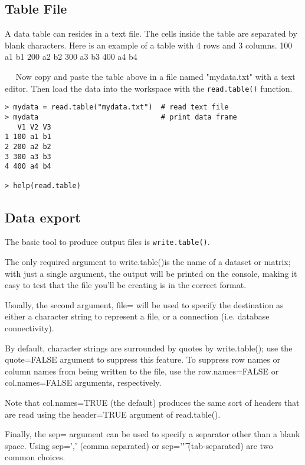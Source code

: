 \subsection{Table File}
 A data table can resides in a text file. The cells inside the table are separated by blank characters. Here is an example of a table with 4 rows and 3 columns.
100   a1   b1 
200   a2   b2 
300   a3   b3 
400   a4   b4 
 
 
Now copy and paste the table above in a file named "mydata.txt" with a text editor. Then load the data into the workspace with the \texttt{read.table()} function.

\begin{framed}
\begin{verbatim}
> mydata = read.table("mydata.txt")  # read text file 
> mydata                             # print data frame 
   V1 V2 V3 
1 100 a1 b1 
2 200 a2 b2 
3 300 a3 b3 
4 400 a4 b4 

> help(read.table) 
\end{verbatim}
\end{framed}
\subsection{Data export}
The basic tool to produce output files is \texttt{write.table()}.
 
The only required argument to write.table()is the name of a dataset or matrix; with just a single argument, the output will be printed on the console, making it easy to test that the file you’ll be creating is in the correct format. 

Usually, the second argument, file= will be used to specify the destination as either a character string to represent a file, or a connection (i.e. database connectivity).

By default, character strings are surrounded by quotes by write.table(); use the quote=FALSE argument to suppress this feature. To suppress row names or column names from being written to the file, use the row.names=FALSE or col.names=FALSE arguments, respectively. 

Note that col.names=TRUE (the default) produces the same sort of headers that are read using the header=TRUE argument of read.table(). 

Finally, the sep= argument can be used to specify a separator other than a blank space. Using sep=’,’ (comma separated) or sep=’\t’ (tab-separated) are two common choices.


